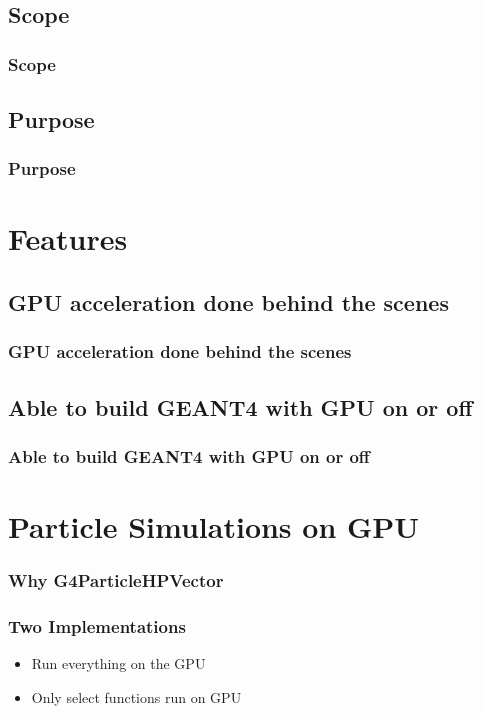 \documentclass{beamer}
\begin{document}
\subsection{Scope}
\begin{frame}
\frametitle{Scope}
\end{frame}

\subsection{Purpose}
\begin{frame}
\frametitle{Purpose}
\end{frame}


\section{Features}
\subsection{GPU acceleration done behind the scenes}
\begin{frame}
\frametitle{GPU acceleration done behind the scenes}
\begin{itemize}
\end{itemize}
\end{frame}

\subsection{Able to build GEANT4 with GPU on or off}
\begin{frame}
\frametitle{Able to build  GEANT4 with GPU on or off}
\end{frame}

\section{Particle Simulations on GPU}
\begin{frame}
\frametitle{Why G4ParticleHPVector}
\end{frame}

\begin{frame}
\frametitle{Two Implementations}
\begin{itemize}
\item Run everything on the GPU
\item Only select functions run on GPU
\end{itemize}
\end{frame}
\end{document}
